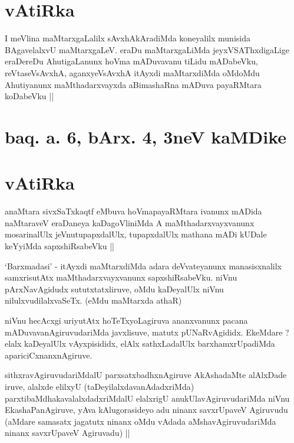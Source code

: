 \vishaya{\stext}

\section*{vAtiRka}

\begin{artha}
I meVlina maMtarxgaLalilx sAvxhAkAradiMda koneyalilx munisida BAgavelalxvU maMtarxgaLeV. eraDu maMtarxgaLiMda jeyxVSAThxdigaLige eraDereDu AhutigaLanunx hoVma mADuvavanu tiLidu mADabeVku, reVtaseVsAvxhA, aganxyeVsAvxhA itAyxdi maMtarxdiMda oMdoMdu Ahutiyanunx maMthadarxvayxda aBimashaRna mADuva payaRMtara koDabeVku ||
\end{artha}

\section{baq. a. 6, bArx. 4, 3neV kaMDike}

\section*{vAtiRka}

\begin{artha}
anaMtara sivxSaTxkaqtf eMbuva hoVmapayaRMtara ivanunx mADida naMtaraveV eraDaneya kaDagoVliniMda A maMthadarxvayxvanunx mosarinalUlx jeVnutupapxdalUlx, tupapxdalUlx mathana mADi kUDale keYyiMda sapxshiRsabeVku ||
\end{artha}


\begin{artha}
`Barxmadasi' - itAyxdi maMtarxdiMda adara deVvateyanunx manasisxnalilx samxrisutAtx maMthadarxvayxvanunx sapxshiRsabeVku. niVnu pArxNavAgidudx sututxtatxliruve, oMdu kaDeyalUlx niVnu nilulxvudilalxvaSeTx. (eMdu maMtarxda athaR)
\end{artha}


\begin{artha}
niVnu hecAcxgi uriyutAtx hoTeTxyoLagiruva ananxvanunx pacana mADuvavanAgiruvudariMda javxlisuve, matutx pUNaRvAgididx. EkeMdare ? elalx kaDeyalUlx vAyxpisididx, elAlx sathxLadalUlx barxhamxrUpadiMda apariciCxnanxnAgiruve.
\end{artha}


\begin{artha}
sithxravAgiruvudariMdalU parxsatxbadhxnAgiruve AkAshadaMte alAlxDade iruve, alalxde elilxyU (taDeyilalxdavanAdadxriMda) parxtibaMdhakavalalxdadxriMdalU elalxrigU anukUlavAgiruvudariMda niVnu EkashaPanAgiruve, yAva kAlugorasideyo adu ninanx savxrUpaveV Agiruvudu (aMdare samasatx jagatutx ninanx oMdu vAdada aMshavAgiruvudariMda ninanx savxrUpaveV Agiruvadu) ||
\end{artha}

